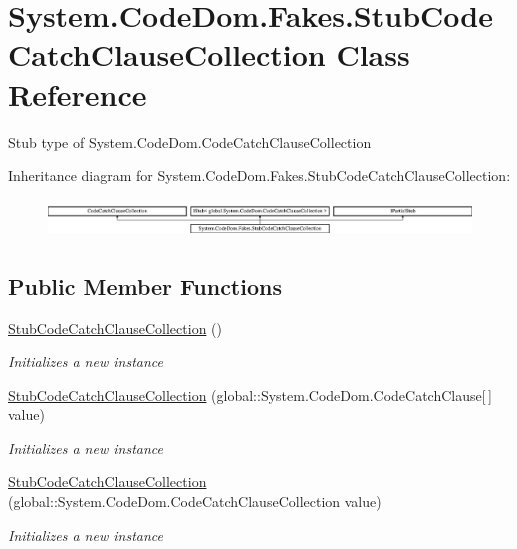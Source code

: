 \hypertarget{class_system_1_1_code_dom_1_1_fakes_1_1_stub_code_catch_clause_collection}{\section{System.\-Code\-Dom.\-Fakes.\-Stub\-Code\-Catch\-Clause\-Collection Class Reference}
\label{class_system_1_1_code_dom_1_1_fakes_1_1_stub_code_catch_clause_collection}
}


Stub type of System.\-Code\-Dom.\-Code\-Catch\-Clause\-Collection 


Inheritance diagram for System.\-Code\-Dom.\-Fakes.\-Stub\-Code\-Catch\-Clause\-Collection\-:\begin{figure}[H]
\begin{center}
\leavevmode
\includegraphics[height=1.006289cm]{class_system_1_1_code_dom_1_1_fakes_1_1_stub_code_catch_clause_collection}
\end{center}
\end{figure}
\subsection*{Public Member Functions}
\begin{DoxyCompactItemize}
\item 
\hyperlink{class_system_1_1_code_dom_1_1_fakes_1_1_stub_code_catch_clause_collection_a66d14f1cd9b1bdb7749139468cfca70a}{Stub\-Code\-Catch\-Clause\-Collection} ()
\begin{DoxyCompactList}\small\item\em Initializes a new instance\end{DoxyCompactList}\item 
\hyperlink{class_system_1_1_code_dom_1_1_fakes_1_1_stub_code_catch_clause_collection_a6d834e49d40beb5ca7b7e2ee108bdf99}{Stub\-Code\-Catch\-Clause\-Collection} (global\-::\-System.\-Code\-Dom.\-Code\-Catch\-Clause\mbox{[}$\,$\mbox{]} value)
\begin{DoxyCompactList}\small\item\em Initializes a new instance\end{DoxyCompactList}\item 
\hyperlink{class_system_1_1_code_dom_1_1_fakes_1_1_stub_code_catch_clause_collection_abdb2d06da8dfc70e4bc674bffd5a9916}{Stub\-Code\-Catch\-Clause\-Collection} (global\-::\-System.\-Code\-Dom.\-Code\-Catch\-Clause\-Collection value)
\begin{DoxyCompactList}\small\item\em Initializes a new instance\end{DoxyCompactList}\end{DoxyCompactItemize}
